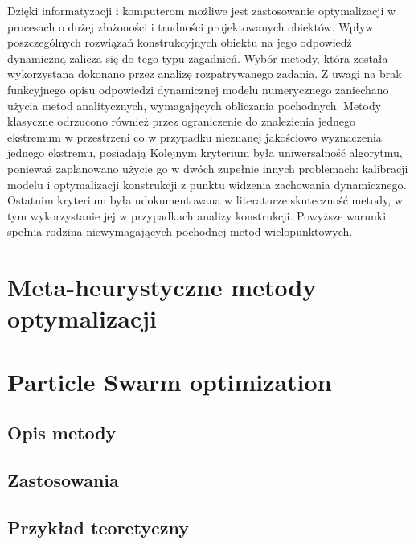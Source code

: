 Dzięki informatyzacji i komputerom możliwe jest zastosowanie optymalizacji w procesach o dużej złożoności i trudności projektowanych obiektów. Wpływ poszczególnych rozwiązań konstrukcyjnych obiektu na jego odpowiedź dynamiczną zalicza się do tego typu zagadnień. Wybór metody, która została wykorzystana dokonano przez analizę rozpatrywanego zadania. Z uwagi na brak funkcyjnego opisu odpowiedzi dynamicznej modelu numerycznego zaniechano użycia metod analitycznych, wymagających obliczania pochodnych. Metody klasyczne odrzucono również przez ograniczenie do znalezienia jednego ekstremum w przestrzeni co w przypadku nieznanej jakościowo  wyznaczenia jednego ekstremu, posiadają  Kolejnym kryterium była uniwersalność algorytmu, ponieważ zaplanowano użycie go w dwóch zupełnie innych problemach: kalibracji modelu i optymalizacji konstrukcji z punktu widzenia zachowania dynamicznego. Ostatnim kryterium była udokumentowana w literaturze skuteczność metody, w tym wykorzystanie jej w przypadkach analizy konstrukcji. Powyższe warunki spełnia rodzina niewymagających pochodnej metod wielopunktowych.
\section{Meta-heurystyczne metody optymalizacji}

\section{Particle Swarm optimization}
\subsection{Opis metody}
\subsection{Zastosowania}
\subsection{Przykład teoretyczny}